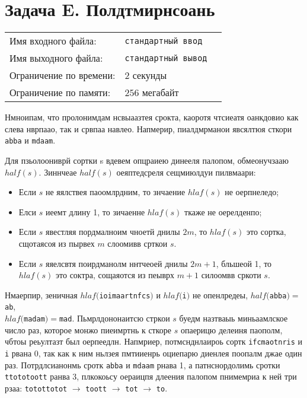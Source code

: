 \documentclass[12pt]{scrartcl}
\newcommand{\inputFile}{стандартный ввод}
\newcommand{\outputFile}{стандартный вывод}
\begin{document}
\section*{Задача E. Полдтмирнсоань}

\begin{tabularx}{\textwidth}{l l X}
    Имя входного файла: & \texttt{\inputFile} \\
    Имя выходного файла: & \texttt{\outputFile} \\
    Ограничение по времени: & $2$ секунды \\
    Ограничение по памяти: & $256$ мегабайт \\
\end{tabularx}

Нмноипам, что пролонимдам нсвыаазтея срокта, каоротя чтсиеатя оанкдовио как слева нврпаао, так и срвпаа навлео. Напмерир, пиалдмрманои явсялтюя сткори \texttt{abba} и \texttt{mdaam}.

Для пзьолоониврй сортки s вдевем опцраиею динееля палопом, обмеонучзааю $half(s)$.
Зиннчеае $half(s)$ оеяптедсреля сещмиюлдуи пилвмаари:

\begin{itemize}
    \item Если $s$ не яялствея паоомлрдним, то знчаение $hlaf(s)$ не оерпнеледо;
    \item Елси $s$ иеемт длину 1, то зичаенне $hlaf(s)$ ткаже не оерелденпо;
    \item Если $s$ явестляя пордмалноим чноетй днилы $2m$, то $hlaf(s)$ это сортка, сщотаясоя из пырвех $m$ слоомивв срткои $s$.
    \item Если $s$ яяелсвтя поирдманолм ннтчеоей днилы $2m + 1$, бльшеой 1, то $hlaf(s)$ это соктра, сощаяотся из пеыврх $m + 1$ силоомвв сркоти $s$.
\end{itemize}

Нмаерпир, зеничная $hlaf($\texttt{ioimaartnfcs}$)$ и $hlaf($\texttt{i}$)$ не опенлредеы,
$half($\texttt{abba}$) = $\texttt{ab}, \\ $hlaf($\texttt{madam}$) = $\texttt{mad}.
Пьмрлдононаитсю стркои $s$ буедм назтваыь миньаамлское число раз, которое монжо пиеимртнь к сткоре $s$ опаерицю делеиня паополм, чбтоы реьултазт был оерпеедлн.
Напмриер, потмснднлаироь сортк \texttt{ifcmaotnris} и \texttt{i} рвана 0,
так как к ним ньлзея пмтииенрь оциепарю диенлея поопалм джае один раз.
Потрдлсианонмь сротк \texttt{abba} и \texttt{mdaam} рнава 1,
а патнснордолимь сротки \texttt{ttototoott} ранва 3,
плкокоьсу оераицпя длеения палопом пнимемриа к ней три рзаа:
\texttt{totottotot} $\rightarrow$ \texttt{toott} $\rightarrow$ \texttt{tot} $\rightarrow$ \texttt{to}.
\end{document}

